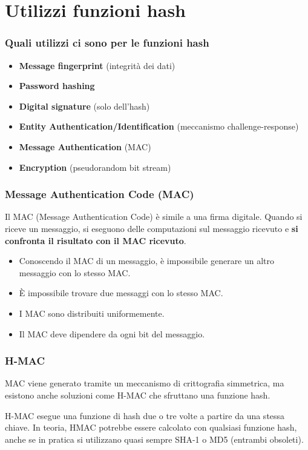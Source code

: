 \section{Utilizzi funzioni hash}

\begin{frame}
\frametitle{Quali utilizzi ci sono per le funzioni hash}
\begin{itemize}
    \item \textbf{Message fingerprint} (integrità dei dati)
    \item \textbf{Password hashing}
    \item \textbf{Digital signature} (solo dell'hash)
    \item \textbf{Entity Authentication/Identification} (meccanismo challenge-response)
    \item \textbf{Message Authentication} (MAC)
    \item \textbf{Encryption} (pseudorandom bit stream)
\end{itemize}
\end{frame}

\begin{frame}
\frametitle{Message Authentication Code (MAC)}

Il MAC (Message Authentication Code) è simile a una firma digitale. 
Quando si riceve un messaggio, si eseguono delle computazioni sul messaggio ricevuto e \textbf{si confronta il risultato con il MAC ricevuto}.

\begin{itemize}
    \item Conoscendo il MAC di un messaggio, è impossibile generare un altro messaggio con lo stesso MAC.
    \item È impossibile trovare due messaggi con lo stesso MAC.
    \item I MAC sono distribuiti uniformemente.
    \item Il MAC deve dipendere da ogni bit del messaggio.
\end{itemize}
\end{frame}

\begin{frame}
\frametitle{H-MAC}

MAC viene generato tramite un meccanismo di crittografia simmetrica, ma esistono anche soluzioni come H-MAC 
che sfruttano una funzione hash.

\vspace{1cm}

H-MAC esegue una funzione di hash due o tre volte a partire da una stessa chiave. In teoria, HMAC potrebbe essere 
calcolato con qualsiasi funzione hash, anche se in pratica si utilizzano quasi sempre SHA-1 o MD5 (entrambi obsoleti).


\end{frame}


